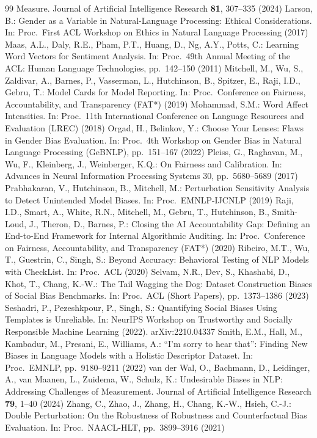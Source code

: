 \documentclass[runningheads]{llncs}
\begin{document}
\begin{thebibliography}{99}
Measure. Journal of Artificial Intelligence Research \textbf{81}, 307--335 (2024)
 Larson, B.: Gender as a Variable in Natural-Language
Processing: Ethical Considerations. In: Proc.\ First ACL Workshop on Ethics
in Natural Language Processing (2017)
 Maas, A.L., Daly, R.E., Pham, P.T., Huang, D., Ng, A.Y.,
Potts, C.: Learning Word Vectors for Sentiment Analysis. In: Proc.\ 49th Annual
Meeting of the ACL: Human Language Technologies, pp.\ 142--150 (2011)
 Mitchell, M., Wu, S., Zaldivar, A., Barnes, P.,
Vasserman, L., Hutchinson, B., Spitzer, E., Raji, I.D., Gebru, T.: Model Cards
for Model Reporting. In: Proc.\ Conference on Fairness, Accountability, and
Transparency (FAT*) (2019)
 Mohammad, S.M.: Word Affect Intensities. In: Proc.\ 11th
International Conference on Language Resources and Evaluation (LREC) (2018)
 Orgad, H., Belinkov, Y.: Choose Your Lenses: Flaws in Gender Bias
Evaluation. In: Proc.\ 4th Workshop on Gender Bias in Natural Language
Processing (GeBNLP), pp.\ 151--167 (2022)
 Pleiss, G., Raghavan, M., Wu, F., Kleinberg, J., Weinberger, K.Q.: On Fairness
and Calibration. In: Advances in Neural Information Processing Systems 30,
pp.\ 5680--5689 (2017)
 Prabhakaran, V., Hutchinson, B., Mitchell, M.:
Perturbation Sensitivity Analysis to Detect Unintended Model Biases. In: Proc.\
EMNLP-IJCNLP (2019)
 Raji, I.D., Smart, A., White, R.N., Mitchell, M., Gebru,
T., Hutchinson, B., Smith-Loud, J., Theron, D., Barnes, P.: Closing the AI
Accountability Gap: Defining an End-to-End Framework for Internal Algorithmic
Auditing. In: Proc.\ Conference on Fairness, Accountability, and Transparency
(FAT*) (2020)
 Ribeiro, M.T., Wu, T., Guestrin, C., Singh, S.: Beyond
Accuracy: Behavioral Testing of NLP Models with CheckList. In: Proc.\ ACL
(2020)
 Selvam, N.R., Dev, S., Khashabi, D., Khot, T., Chang,
K.-W.: The Tail Wagging the Dog: Dataset Construction Biases of Social Bias
Benchmarks. In: Proc.\ ACL (Short Papers), pp.\ 1373--1386 (2023)
\bibitem{seshadri2022} Seshadri, P., Pezeshkpour, P., Singh, S.: Quantifying
Social Biases Using Templates is Unreliable. In: NeurIPS Workshop on Trustworthy
and Socially Responsible Machine Learning (2022). arXiv:2210.04337
\bibitem{smith2022} Smith, E.M., Hall, M., Kambadur, M., Presani, E., Williams, A.: ``I'm sorry to
hear that'': Finding New Biases in Language Models with a Holistic Descriptor
Dataset. In: Proc.\ EMNLP, pp.\ 9180--9211 (2022)
 van der Wal, O., Bachmann, D., Leidinger, A., van Maanen, L., Zuidema, W.,
Schulz, K.: Undesirable Biases in NLP: Addressing Challenges of Measurement.
Journal of Artificial Intelligence Research \textbf{79}, 1--40 (2024)
\bibitem{zhang2021} Zhang, C., Zhao, J., Zhang, H., Chang, K.-W., Hsieh, C.-J.:
Double Perturbation: On the Robustness of Robustness and Counterfactual Bias
Evaluation. In: Proc.\ NAACL-HLT, pp.\ 3899--3916 (2021)
\end{thebibliography}
\end{document}
